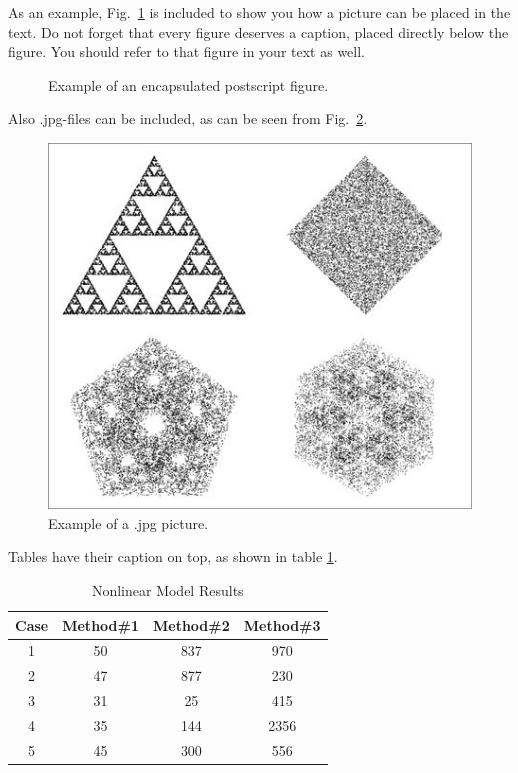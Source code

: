 \documentclass[a4paper]{article}
\begin{document}
As an example, Fig.~\ref{fig:res} is included to show you how a picture can be placed in the text. Do not forget that every figure deserves a caption, placed directly below the figure. You should refer to that figure in your text as well.
%
\begin{figure}[htb]
  \centering
\centerline{}
\caption{Example of an encapsulated postscript figure.}
\label{fig:res}
\end{figure}
%

Also .jpg-files can be included, as can be seen from Fig.~\ref{chaos}.
\begin{figure}[!ht]
\begin{center}
\includegraphics[width=0.75\columnwidth]{chaos.jpg}
\caption{Example of a .jpg picture.}
\label{chaos}
\end{center}
\end{figure}
%

Tables have their caption on top, as shown in table \ref{tabex}.
%
\begin{table}[ht]
\caption{Nonlinear Model Results} %
\label{tabex} %
\centering %
\begin{tabular}{c c c c} %
\hline\hline %
Case & Method\#1 & Method\#2 & Method\#3 \\ [0.5ex] %
\hline %
1 & 50 & 837 & 970 \\ %
2 & 47 & 877 & 230 \\
3 & 31 & 25 & 415 \\
4 & 35 & 144 & 2356 \\
5 & 45 & 300 & 556 \\ [1ex] %
\hline %
\end{tabular}
\end{table}
%
\end{document}

